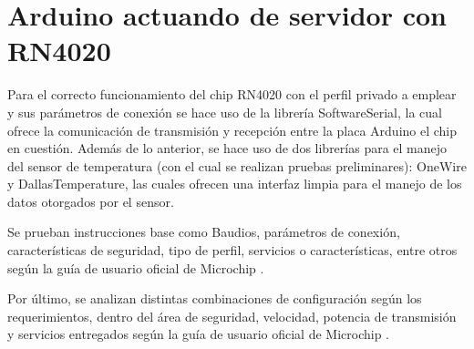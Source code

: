 \section{Arduino actuando de servidor con RN4020}

Para el correcto funcionamiento del chip RN4020 con el perfil privado a emplear y sus parámetros de conexión se hace uso de la librería SoftwareSerial, la cual ofrece la comunicación de transmisión y recepción entre la placa Arduino el chip en cuestión.
Además de lo anterior, se hace uso de dos librerías para el manejo del sensor de temperatura (con el cual se realizan pruebas preliminares): OneWire y DallasTemperature, las cuales ofrecen una interfaz limpia para el manejo de los datos otorgados por el sensor.

Se prueban instrucciones base como Baudios, parámetros de conexión, características de seguridad, tipo de perfil, servicios o características, entre otros según la guía de usuario oficial de Microchip \cite{user_guide_rn4020}.

Por último, se analizan distintas combinaciones de configuración según los requerimientos, dentro del área de seguridad, velocidad, potencia de transmisión y servicios entregados según la guía de usuario oficial de Microchip \cite{user_guide_rn4020}.

